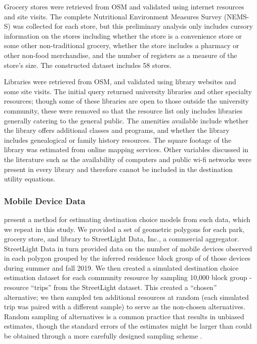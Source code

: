 \documentclass[ijerph,article,submit,moreauthors,pdftex]{mdpi}
\begin{document}
Grocery stores were retrieved from OSM and validated using internet resources and
site visits. The complete Nutritional Environment Measures Survey (NEMS-S) \citep{glanz2007}
was collected for each store, but this preliminary analysis only includes
cursory information on the stores including whether the store is a convenience store
or some other non-traditional grocery, whether the store includes a pharmacy or
other non-food merchandise, and the number of registers as a measure of the
store's size. The constructed dataset includes 58 stores.

Libraries were retrieved from OSM, and validated using library websites and
some site visits. The initial query returned university libraries and other
specialty resources; though some of these libraries are open to those outside
the university community, these were removed so that the resource list only
includes libraries generally catering to the general public. The amenities
available include whether the library offers additional classes and programs,
and whether the library includes genealogical or family history resources. The
square footage of the library was estimated from online mapping services.
Other variables discussed in the literature such as the availability of computers
and public wi-fi networks were present in every library and therefore cannot
be included in the destination utility equations.

\hypertarget{mobile-device-data}{%
\subsubsection{Mobile Device Data}\label{mobile-device-data}}

\citet{alamedaparks} present a method for estimating destination choice models from
such data, which we repeat in this study. We provided a set of geometric
polygons for each park, grocery store, and library to StreetLight Data, Inc., a
commercial aggregator. StreetLight Data in turn provided data on the number of
mobile devices observed in each polygon grouped by the inferred residence block
group of of those devices during summer and fall 2019.
We then created a simulated destination choice estimation dataset for each
community resource by sampling 10,000 block group - resource ``trips'' from the
StreetLight dataset. This created a ``chosen'' alternative; we then sampled ten additional
resources at random (each simulated trip was paired with a different sample) to
serve as the non-chosen alternatives. Random sampling of alternatives is a
common practice that results in unbiased estimates, though the standard errors
of the estimates might be larger than could be obtained through a more carefully
designed sampling scheme \citep{train2009}.
\end{document}
